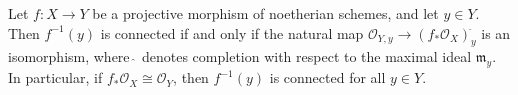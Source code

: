 Let $f: X \to Y$ be a projective morphism of noetherian schemes, and let $y \in Y$. Then $f^{-1}(y)$ is connected if and only if the natural map $\mathcal{O}_{Y,y} \to (f_*\mathcal{O}_X)_y^{\widehat{\ }}$ is an isomorphism, where $\widehat{\ }$ denotes completion with respect to the maximal ideal $\mathfrak{m}_y$. In particular, if $f_*\mathcal{O}_X \cong \mathcal{O}_Y$, then $f^{-1}(y)$ is connected for all $y \in Y$.
